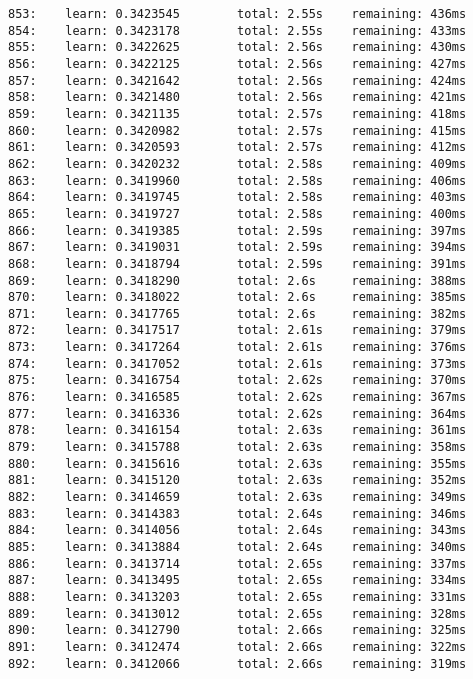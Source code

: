 \documentclass[11pt]{article}
\begin{document}
\begin{Verbatim}[commandchars=\\\{\}]
853:    learn: 0.3423545        total: 2.55s    remaining: 436ms
854:    learn: 0.3423178        total: 2.55s    remaining: 433ms
855:    learn: 0.3422625        total: 2.56s    remaining: 430ms
856:    learn: 0.3422125        total: 2.56s    remaining: 427ms
857:    learn: 0.3421642        total: 2.56s    remaining: 424ms
858:    learn: 0.3421480        total: 2.56s    remaining: 421ms
859:    learn: 0.3421135        total: 2.57s    remaining: 418ms
860:    learn: 0.3420982        total: 2.57s    remaining: 415ms
861:    learn: 0.3420593        total: 2.57s    remaining: 412ms
862:    learn: 0.3420232        total: 2.58s    remaining: 409ms
863:    learn: 0.3419960        total: 2.58s    remaining: 406ms
864:    learn: 0.3419745        total: 2.58s    remaining: 403ms
865:    learn: 0.3419727        total: 2.58s    remaining: 400ms
866:    learn: 0.3419385        total: 2.59s    remaining: 397ms
867:    learn: 0.3419031        total: 2.59s    remaining: 394ms
868:    learn: 0.3418794        total: 2.59s    remaining: 391ms
869:    learn: 0.3418290        total: 2.6s     remaining: 388ms
870:    learn: 0.3418022        total: 2.6s     remaining: 385ms
871:    learn: 0.3417765        total: 2.6s     remaining: 382ms
872:    learn: 0.3417517        total: 2.61s    remaining: 379ms
873:    learn: 0.3417264        total: 2.61s    remaining: 376ms
874:    learn: 0.3417052        total: 2.61s    remaining: 373ms
875:    learn: 0.3416754        total: 2.62s    remaining: 370ms
876:    learn: 0.3416585        total: 2.62s    remaining: 367ms
877:    learn: 0.3416336        total: 2.62s    remaining: 364ms
878:    learn: 0.3416154        total: 2.63s    remaining: 361ms
879:    learn: 0.3415788        total: 2.63s    remaining: 358ms
880:    learn: 0.3415616        total: 2.63s    remaining: 355ms
881:    learn: 0.3415120        total: 2.63s    remaining: 352ms
882:    learn: 0.3414659        total: 2.63s    remaining: 349ms
883:    learn: 0.3414383        total: 2.64s    remaining: 346ms
884:    learn: 0.3414056        total: 2.64s    remaining: 343ms
885:    learn: 0.3413884        total: 2.64s    remaining: 340ms
886:    learn: 0.3413714        total: 2.65s    remaining: 337ms
887:    learn: 0.3413495        total: 2.65s    remaining: 334ms
888:    learn: 0.3413203        total: 2.65s    remaining: 331ms
889:    learn: 0.3413012        total: 2.65s    remaining: 328ms
890:    learn: 0.3412790        total: 2.66s    remaining: 325ms
891:    learn: 0.3412474        total: 2.66s    remaining: 322ms
892:    learn: 0.3412066        total: 2.66s    remaining: 319ms

\end{Verbatim}
\end{document}
